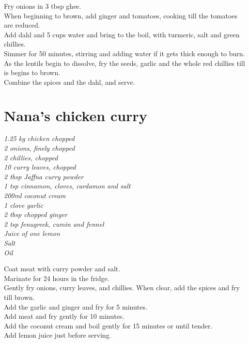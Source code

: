 \documentclass{tufte-book}
\begin{document}
Fry onions in 3 tbsp ghee. 
\\When beginning to brown, add ginger and tomatoes, cooking till the tomatoes are reduced.
\\Add dahl and 5 cups water and bring to the boil, with turmeric, salt and green chillies.
\\Simmer for 50 minutes, stirring and adding water if it gets thick enough to burn.
\\As the lentils begin to dissolve, fry the seeds, garlic and the whole red chillies till is begins to brown. 
\\Combine the spices and the dahl, and serve.


\section{Nana's chicken curry}

\emph{1.25 kg chicken chopped
\\2 onions, finely chopped
\\2 chillies, chopped
\\10 curry leaves, chopped
\\2 tbsp Jaffna curry powder
\\1 tsp cinnamon, cloves, cardamon and salt
\\200ml coconut cream
\\1 clove garlic
\\2 tbsp chopped ginger
\\2 tsp fenugreek, cumin and fennel
\\Juice of one lemon
\\Salt
\\Oil}

Coat meat with curry powder and salt. 
\\Marinate for 24 hours in the fridge.
\\Gently fry onions, curry leaves, and chillies. When clear, add the spices and fry till brown.
\\Add the garlic and ginger and fry for 5 minutes.
\\Add meat and fry gently for 10 minutes.
\\Add the coconut cream and boil gently for 15 minutes or until tender.
\\Add lemon juice just before serving.
\end{document}
